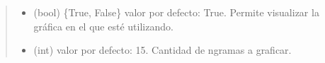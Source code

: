 \documentclass[letterpaper,10pt,openany,spanish]{sphinxmanual}
\begin{document}
\begin{fulllineitems}
\begin{quote}
\begin{description}
\begin{itemize}
\item {} 
 \textendash{} (bool) \{True, False\} valor por defecto: True. Permite visualizar la gráfica en el  que esté utilizando.

\item {} 
 \textendash{} (int) valor por defecto: 15. Cantidad de n\sphinxhyphen{}gramas a graficar.

\end{itemize}

\end{description}\end{quote}

\end{fulllineitems}

\end{document}
